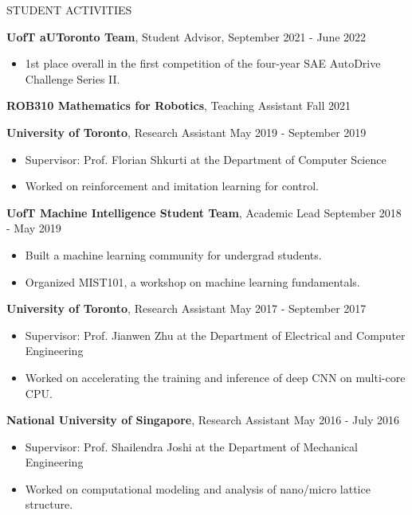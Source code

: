 \documentclass{cv}
\begin{document}
\begin{rSection}{STUDENT ACTIVITIES}
  \item \textbf{UofT aUToronto Team}, Student Advisor,  \hfill September 2021 - June 2022
  \vspace{-0.25em}
  \begin{itemize}[noitemsep,topsep=0pt]
    \item 1st place overall in the first competition of the four-year SAE AutoDrive Challenge Series II.
  \end{itemize}
  \item \textbf{ROB310 Mathematics for Robotics}, Teaching Assistant \hfill Fall 2021
  \item \textbf{University of Toronto}, Research Assistant \hfill May 2019 - September 2019
  \vspace{-0.25em}
  \begin{itemize}[noitemsep,topsep=0pt]
    \item Supervisor: Prof. Florian Shkurti at the Department of Computer Science
    \item Worked on reinforcement and imitation learning for control.
  \end{itemize}
  \item \textbf{UofT Machine Intelligence Student Team}, Academic Lead \hfill September 2018 - May 2019
  \vspace{-0.25em}
  \begin{itemize}[noitemsep,topsep=0pt]
    \item Built a machine learning community for undergrad students.
    \item Organized MIST101, a workshop on machine learning fundamentals.
  \end{itemize}
  \item \textbf{University of Toronto}, Research Assistant \hfill May 2017 - September 2017
  \vspace{-0.25em}
  \begin{itemize}[noitemsep,topsep=0pt]
    \item Supervisor: Prof. Jianwen Zhu at the Department of Electrical and Computer Engineering
    \item Worked on accelerating the training and inference of deep CNN on multi-core CPU.
  \end{itemize}
  \item \textbf{National University of Singapore}, Research Assistant \hfill May 2016 - July 2016
  \vspace{-0.25em}
  \begin{itemize}[noitemsep,topsep=0pt]
    \item Supervisor: Prof. Shailendra Joshi at the Department of Mechanical Engineering
    \item Worked on computational modeling and analysis of nano/micro lattice structure.
  \end{itemize}
\end{rSection}
\end{document}

